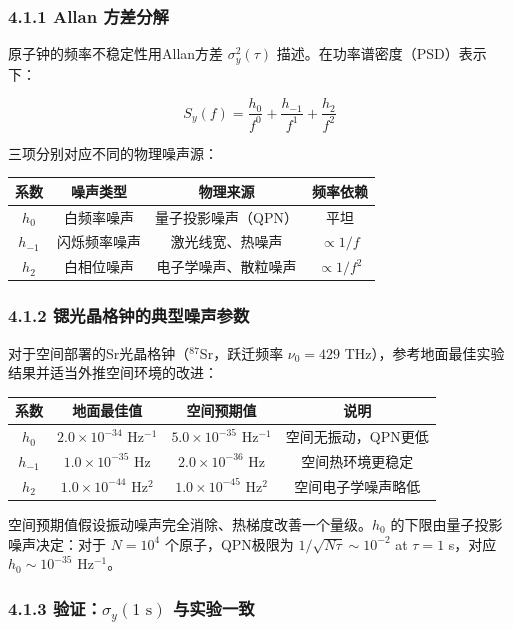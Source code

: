 \documentclass[12pt,a4paper]{article}
\begin{document}
\subsubsection{4.1.1 Allan 方差分解}


原子钟的频率不稳定性用Allan方差 $\sigma_y^2(\tau)$ 描述。在功率谱密度（PSD）表示下：

$$S_y(f) = \frac{h_0}{f^0} + \frac{h_{-1}}{f^1} + \frac{h_2}{f^2}$$

三项分别对应不同的物理噪声源：

\begin{tabular}{|c|c|c|c|}
\hline
系数 & 噪声类型 & 物理来源 & 频率依赖 \\
\hline
$h_0$ & 白频率噪声 & 量子投影噪声（QPN） & 平坦 \\
$h_{-1}$ & 闪烁频率噪声 & 激光线宽、热噪声 & $\propto 1/f$ \\
$h_2$ & 白相位噪声 & 电子学噪声、散粒噪声 & $\propto 1/f^2$ \\
\hline
\end{tabular}


\subsubsection{4.1.2 锶光晶格钟的典型噪声参数}


对于空间部署的Sr光晶格钟（$^{87}$Sr，跃迁频率 $\nu_0 = 429$ THz），参考地面最佳实验结果并适当外推空间环境的改进：

\begin{tabular}{|c|c|c|c|}
\hline
系数 & 地面最佳值 & 空间预期值 & 说明 \\
\hline
$h_0$ & $2.0 \times 10^{-34}$ Hz$^{-1}$ & $5.0 \times 10^{-35}$ Hz$^{-1}$ & 空间无振动，QPN更低 \\
$h_{-1}$ & $1.0 \times 10^{-35}$ Hz & $2.0 \times 10^{-36}$ Hz & 空间热环境更稳定 \\
$h_2$ & $1.0 \times 10^{-44}$ Hz$^2$ & $1.0 \times 10^{-45}$ Hz$^2$ & 空间电子学噪声略低 \\
\hline
\end{tabular}


空间预期值假设振动噪声完全消除、热梯度改善一个量级。$h_0$ 的下限由量子投影噪声决定：对于 $N = 10^4$ 个原子，QPN极限为 $1/\sqrt{N\tau} \sim 10^{-2}$ at $\tau = 1$ s，对应 $h_0 \sim 10^{-35}$ Hz$^{-1}$。

\subsubsection{4.1.3 验证：$\sigma_y(1\text{ s})$ 与实验一致}
\end{document}
